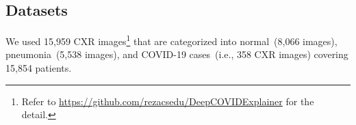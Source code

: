 \documentclass[conference]{IEEEtran}
\begin{document}
\subsection{Datasets}
\label{sec:ds}

We used 15,959 CXR images\footnote{Refer to \url{https://github.com/rezacsedu/DeepCOVIDExplainer} for the detail.} that are categorized into normal~(8,066 images), pneumonia~(5,538 images), and COVID-19 cases~(i.e., 358 CXR images) covering 15,854 patients. %

\end{document}
